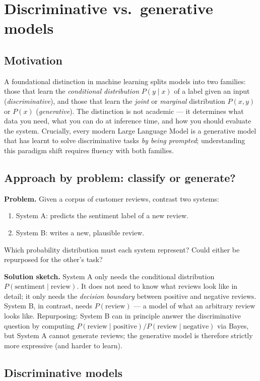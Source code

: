 \documentclass[12pt,a4paper]{report}
\theoremstyle{definition}
\theoremstyle{remark}
\begin{document}
\section{Discriminative vs.\ generative models}

\subsection{Motivation}
A foundational distinction in machine learning splits models into two families: those that learn the \emph{conditional distribution} $P(y \mid x)$ of a label given an input (\emph{discriminative}), and those that learn the \emph{joint} or \emph{marginal} distribution $P(x, y)$ or $P(x)$ (\emph{generative}). The distinction is not academic --- it determines what data you need, what you can do at inference time, and how you should evaluate the system. Crucially, every modern Large Language Model is a generative model that has learnt to solve discriminative tasks \emph{by being prompted}; understanding this paradigm shift requires fluency with both families.

\subsection{Approach by problem: classify or generate?}
\textbf{Problem.} Given a corpus of customer reviews, contrast two systems:
\begin{enumerate}
    \item System A: predicts the sentiment label of a new review.
    \item System B: writes a new, plausible review.
\end{enumerate}
Which probability distribution must each system represent? Could either be repurposed for the other's task?

\textbf{Solution sketch.} System A only needs the conditional distribution $P(\text{sentiment} \mid \text{review})$. It does not need to know what reviews look like in detail; it only needs the \emph{decision boundary} between positive and negative reviews. System B, in contrast, needs $P(\text{review})$ --- a model of what an arbitrary review looks like. Repurposing: System B can in principle answer the discriminative question by computing $P(\text{review} \mid \text{positive}) / P(\text{review} \mid \text{negative})$ via Bayes, but System A cannot generate reviews; the generative model is therefore strictly more expressive (and harder to learn).

\subsection{Discriminative models}
\end{document}
